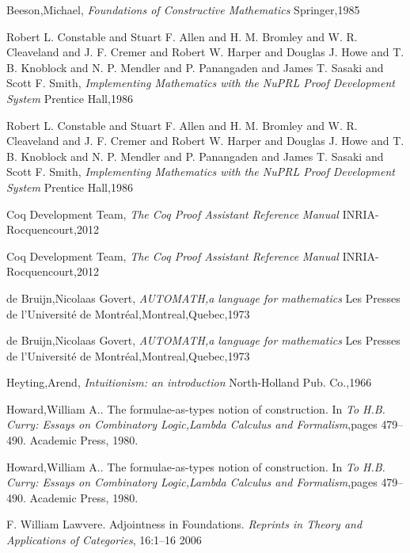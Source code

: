 \documentclass[12pt]{article}
\begin{document}
\begin{thebibliography}{99}

 {Beeson,Michael}, \emph{{Foundations of Constructive Mathematics}}  {Springer},1985

 {Robert L. Constable and Stuart F. Allen and H. M. Bromley and W. R. Cleaveland and J. F. Cremer and Robert W. Harper and Douglas J. Howe and T. B. Knoblock and N. P. Mendler and P. Panangaden and James T. Sasaki and Scott F. Smith}, \emph{{Implementing Mathematics with the {NuPRL} Proof Development System}}  {Prentice Hall},1986

 {Robert L. Constable and Stuart F. Allen and H. M. Bromley and W. R. Cleaveland and J. F. Cremer and Robert W. Harper and Douglas J. Howe and T. B. Knoblock and N. P. Mendler and P. Panangaden and James T. Sasaki and Scott F. Smith}, \emph{{Implementing Mathematics with the {NuPRL} Proof Development System}}  {Prentice Hall},1986

 {{Coq Development Team}}, \emph{{The {C}oq Proof Assistant Reference Manual}}  {INRIA-Rocquencourt},{2012}

 {{Coq Development Team}}, \emph{{The {C}oq Proof Assistant Reference Manual}}  {INRIA-Rocquencourt},{2012}

 {de Bruijn,Nicolaas Govert}, \emph{{A{UTOMATH},a language for mathematics}}  {Les Presses de l'Universit\'e de Montr\'eal,Montreal,Quebec},{1973}

 {de Bruijn,Nicolaas Govert}, \emph{{A{UTOMATH},a language for mathematics}}  {Les Presses de l'Universit\'e de Montr\'eal,Montreal,Quebec},{1973}

 {Heyting,Arend}, \emph{{Intuitionism: an introduction}}  {North-Holland Pub. Co.},{1966}

 {Howard,William A.}. {The formulae-as-types notion of construction}. In \emph{To H.B. Curry: Essays on Combinatory Logic,Lambda Calculus and Formalism},pages {479--490}. {Academic Press}, {1980}.

 {Howard,William A.}. {The formulae-as-types notion of construction}. In \emph{To H.B. Curry: Essays on Combinatory Logic,Lambda Calculus and Formalism},pages {479--490}. {Academic Press}, {1980}.

 {F. William Lawvere}. {Adjointness in Foundations}. \emph{Reprints in Theory and Applications of Categories}, {16}:{1--16} {2006}


\end{thebibliography}
\end{document}
